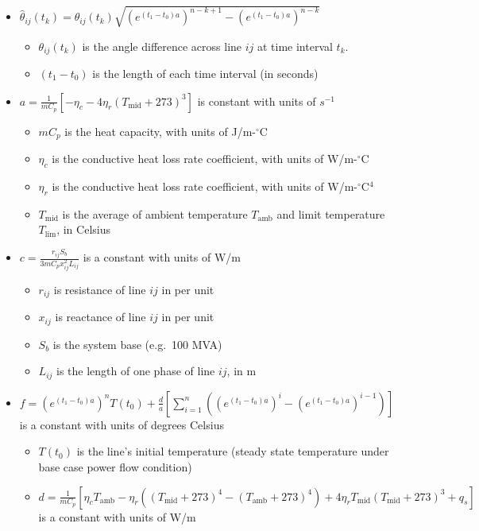 \documentclass{article}
\begin{document}
\begin{itemize}
\itemsep1pt\parskip0pt
\item
  $\hat{\theta}_{ij}(t_{k})=  \theta_{ij}(t_k)\sqrt{ (e^{(t_1-t_0)a})^{n-k+1} - (e^{(t_1-t_0)a})^{n-k} } $

  \begin{itemize}
  \itemsep1pt\parskip0pt
  \item
    $\theta_{ij}(t_k)$ is the angle difference across line $ij$ at time
    interval $t_k$.
  \item
    $(t_1-t_0)$ is the length of each time interval (in seconds)
  \end{itemize}
\item
  $ a =
  \frac{1}{mC_p}\left[ -\eta_c - 4\eta_r(T_\text{mid} + 273)^3 \right]$
  is constant with units of $s^{-1}$

  \begin{itemize}
  \itemsep1pt\parskip0pt
  \item
    $mC_p$ is the heat capacity, with units of J/m-$^\circ$C
  \item
    $\eta_c$ is the conductive heat loss rate coefficient, with units of
    W/m-$^\circ$C
  \item
    $\eta_r$ is the conductive heat loss rate coefficient, with units of
    W/m-$^\circ$C$^4$
  \item
    $T_\text{mid}$ is the average of ambient temperature $T_\text{amb}$
    and limit temperature $T_\text{lim}$, in Celsius
  \end{itemize}
\item
  $c = \frac{r_{ij}S_b}{3 mC_p x_{ij}^2L_{ij}}$ is a constant with units
  of W/m

  \begin{itemize}
  \itemsep1pt\parskip0pt
  \item
    $r_{ij}$ is resistance of line $ij$ in per unit
  \item
    $x_{ij}$ is reactance of line $ij$ in per unit
  \item
    $S_b$ is the system base (e.g.~100 MVA)
  \item
    $L_{ij}$ is the length of one phase of line $ij$, in m
  \end{itemize}
\item
  $f = (e^{(t_1 - t_0)a})^n T(t_0) + \frac{d}{a}\left[ \sum_{i=1}^n \left( (e^{(t_1-t_0)a})^i - (e^{(t_1-t_0)a})^{i-1} \right)\right]$
  is a constant with units of degrees Celsius

  \begin{itemize}
  \itemsep1pt\parskip0pt
  \item
    $T(t_0)$ is the line's initial temperature (steady state temperature
    under base case power flow condition)
  \item
    $d = \frac{1}{mC_p}\left[ \eta_cT_\text{amb} - \eta_r\left((T_\text{mid} + 273)^4 - (T_\text{amb} + 273)^4\right) + 4\eta_rT_\text{mid}(T_\text{mid} + 273)^3 + q_s \right]$
    is a constant with units of W/m


\end{itemize}
\end{itemize}
\end{document}
